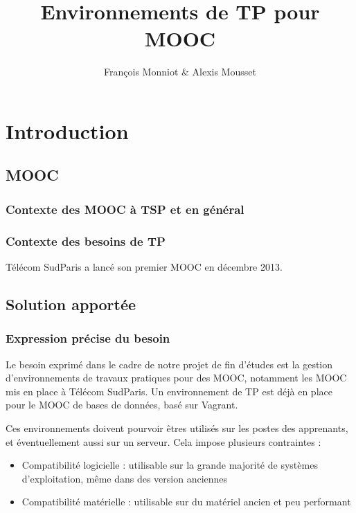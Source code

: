 \documentclass[a4paper,11pt]{report}
\title{Environnements de TP pour MOOC}
\author{François Monniot \& Alexis Mousset}
\begin{document}
\maketitle
\tableofcontents

\begin{abstract}

\end{abstract}
\pagestyle{fancy}
\chapter{Introduction}
\pagestyle{fancy}
\section{MOOC}

\subsection{Contexte des MOOC à TSP et en général}

\subsection{Contexte des besoins de TP}

Télécom SudParis a lancé son premier MOOC en décembre 2013.

\section{Solution apportée}

\subsection{Expression précise du besoin}

Le besoin exprimé dans le cadre de notre projet de fin d'études est la gestion d'environnements de travaux pratiques pour des MOOC, notamment les MOOC mis en place à Télécom SudParis. Un environnement de TP est déjà en place pour le MOOC de bases de données, basé sur Vagrant.

Ces environnements doivent pourvoir êtres utilisés sur les postes des apprenants, et éventuellement aussi sur un serveur. Cela impose plusieurs contraintes :
\begin{itemize}
  \item Compatibilité logicielle : utilisable sur la grande majorité de systèmes d'exploitation, même dans des version anciennes
  \item Compatibilité matérielle : utilisable sur du matériel ancien et peu performant
\end{itemize}
\end{document}
